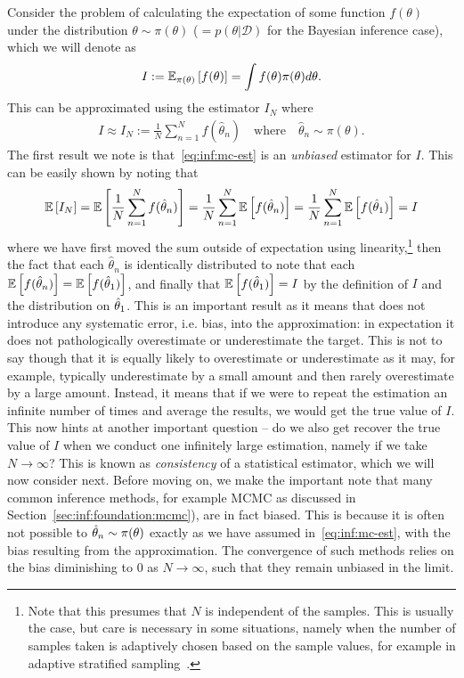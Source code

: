 Consider the problem of calculating the expectation of some function
$f(\theta)$ under the distribution $\theta\sim \pi(\theta)$ ($= p(\theta | \mathcal{D})$ for the Bayesian
inference case), which we will denote 
as
\begin{align}
	\label{eq:inf:expt}
I:=\mathbb{E}_{\pi(\theta)} \left[f(\theta)\right]=\int f(\theta) \pi(\theta) d\theta.
\end{align}
This can be approximated using the \mc estimator $I_N$ where
\begin{align}
	\label{eq:inf:mc-est}
	I \approx I_N := \frac{1}{N} \sum_{n=1}^{N}f(\hat{\theta}_n)
	\quad \text{where} \quad \hat{\theta}_n \sim \pi(\theta).
\end{align}
The first result we note is that~\eqref{eq:inf:mc-est} is an \emph{unbiased} estimator for $I$.  This can
be easily shown by noting that
\begin{align}
\label{eq:inf:unbiased}
\mathbb{E} \left[I_N\right] = \mathbb{E} \left[\frac{1}{N} \sum_{n=1}^{N}f(\hat{\theta}_n)\right]
= \frac{1}{N} \sum_{n=1}^{N} \mathbb{E} \left[f(\hat{\theta}_n)\right]
= \frac{1}{N} \sum_{n=1}^{N} \mathbb{E} \left[f(\hat{\theta}_1)\right]
= I
\end{align}
where we have first moved the sum outside of expectation using
linearity,\footnote{Note that this presumes that $N$ is independent
	of the samples.  This is usually the case, but care is necessary in some situations, namely when
	the number of samples taken is adaptively chosen based on the sample values, for example in
	adaptive stratified sampling~\citep{etore2010adaptive}.}
then the fact that each $\hat{\theta}_n$ is identically distributed to note that
each $\mathbb{E} \left[f(\hat{\theta}_n)\right]= \mathbb{E} \left[f(\hat{\theta}_1)\right]$, and finally
that $\mathbb{E} \left[f(\hat{\theta}_1)\right] = I$ by the definition of $I$ and the distribution
on $\hat{\theta}_1$.  This is an important result as it means that \mc does not introduce
any systematic error, i.e. bias, into the approximation: in expectation it does not
pathologically overestimate or underestimate the target.  This is not to say though that it is
equally likely to overestimate or underestimate as it may, for example, typically underestimate
by a small amount and then rarely overestimate by a large amount.  Instead, it means that if we
were to repeat the estimation an infinite number of times and average the results, we would
get the true value of $I$.  This now hints at another important question -- do we also get
recover the true value of $I$ when we conduct one infinitely large estimation, namely if we
take $N\rightarrow\infty$?  This is known as \emph{consistency} of a statistical estimator,
which we will now consider next.  Before moving
on, we make the important note that many common \mc inference methods, for example MCMC as
discussed in Section~\ref{sec:inf:foundation:mcmc}), are in fact biased.  
This is because it is often not possible to $\hat{\theta}_n \sim \pi(\theta)$
exactly as we have assumed in~\eqref{eq:inf:mc-est}, with the bias resulting from
the approximation.  The convergence of such methods relies on the bias 
diminishing to $0$ as $N\rightarrow\infty$, such that they remain unbiased in the limit.

